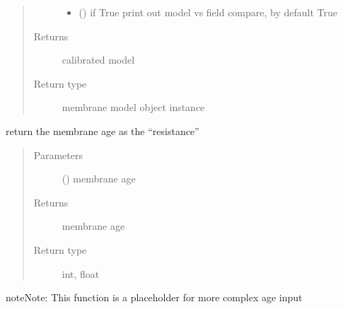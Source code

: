 \documentclass[letterpaper,10pt,english]{sphinxmanual}
\begin{document}
\begin{fulllineitems}
\begin{quote}
\begin{description}
\begin{itemize}
\item {} 
\sphinxAtStartPar
{} (\sphinxstyleliteralemphasis{\sphinxupquote{, }}) \textendash{} if True print out model vs field compare, by default True

\end{itemize}

\item[{Returns}] \leavevmode
\sphinxAtStartPar
calibrated model

\item[{Return type}] \leavevmode
\sphinxAtStartPar
membrane model object instance

\end{description}\end{quote}

\end{fulllineitems}


\begin{fulllineitems}
\label{\detokenize{membrane:membrane.membrane_age}}
\sphinxAtStartPar
return the membrane age as the “resistance”
\begin{quote}\begin{description}
\item[{Parameters}] \leavevmode
\sphinxAtStartPar
{} (\sphinxstyleliteralemphasis{\sphinxupquote{, }}) \textendash{} membrane age

\item[{Returns}] \leavevmode
\sphinxAtStartPar
membrane age

\item[{Return type}] \leavevmode
\sphinxAtStartPar
int, float

\end{description}\end{quote}

\begin{sphinxadmonition}{note}{Note:}
\sphinxAtStartPar
This function is a placeholder for more complex age input
\end{sphinxadmonition}

\end{fulllineitems}
\end{document}
